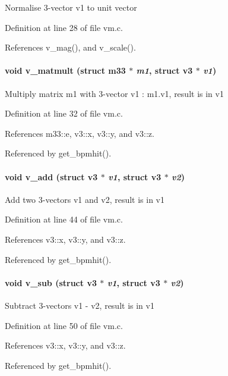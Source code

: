 Normalise 3-vector v1 to unit vector 

Definition at line 28 of file vm.c.

References v\_\-mag(), and v\_\-scale().
\paragraph[v\_\-matmult]{\setlength{\rightskip}{0pt plus 5cm}void v\_\-matmult (struct {\bf m33} $\ast$ {\em m1}, \/  struct {\bf v3} $\ast$ {\em v1})}\hfill\label{group__orbit_gf8bb2c454749d7f96ab0cebf33a43004}


Multiply matrix m1 with 3-vector v1 : m1.v1, result is in v1 

Definition at line 32 of file vm.c.

References m33::e, v3::x, v3::y, and v3::z.

Referenced by get\_\-bpmhit().
\paragraph[v\_\-add]{\setlength{\rightskip}{0pt plus 5cm}void v\_\-add (struct {\bf v3} $\ast$ {\em v1}, \/  struct {\bf v3} $\ast$ {\em v2})}\hfill\label{group__orbit_g99d84c29fa30fb2d9747cae551170114}


Add two 3-vectors v1 and v2, result is in v1 

Definition at line 44 of file vm.c.

References v3::x, v3::y, and v3::z.

Referenced by get\_\-bpmhit().
\paragraph[v\_\-sub]{\setlength{\rightskip}{0pt plus 5cm}void v\_\-sub (struct {\bf v3} $\ast$ {\em v1}, \/  struct {\bf v3} $\ast$ {\em v2})}\hfill\label{group__orbit_gf867ce20f9120602a08d0469f94807bf}


Subtract 3-vectors v1 - v2, result is in v1 

Definition at line 50 of file vm.c.

References v3::x, v3::y, and v3::z.

Referenced by get\_\-bpmhit().
